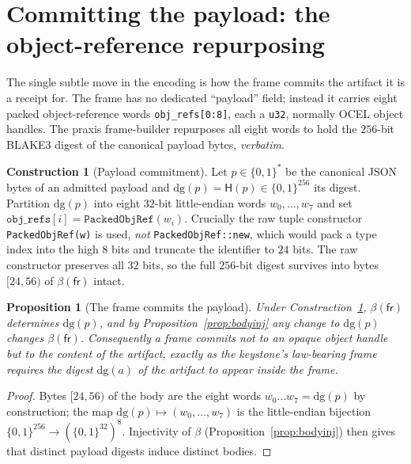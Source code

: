 \documentclass[11pt,oneside]{book}
\theoremstyle{definition}
\newtheorem{construction}{Construction}[chapter]
\theoremstyle{plain}
\newtheorem{proposition}[theorem]{Proposition}
\theoremstyle{remark}
\newcommand{\chainH}{\mathsf{H}}               %
\newcommand{\dg}{\mathrm{dg}}                   %
\newcommand{\fr}{\mathsf{fr}}                   %
\newcommand{\body}{\beta}                       %
\newcommand{\code}[1]{\texttt{#1}}
\begin{document}
\section{Committing the payload: the object-reference repurposing}
\label{sec:commit}

The single subtle move in the encoding is how the frame commits the artifact it is a receipt
for. %
The frame has no dedicated ``payload'' field; instead it carries eight packed
object-reference words \code{obj\_refs[0:8]}, each a \code{u32}, normally OCEL object handles. %
The praxis frame-builder repurposes all eight words to hold the $256$-bit BLAKE3 digest of the
canonical payload bytes, \emph{verbatim}. %

\begin{construction}[Payload commitment]\label{con:commit}
Let $p\in\{0,1\}^{*}$ be the canonical JSON bytes of an admitted payload and $\dg(p)=
\chainH(p)\in\{0,1\}^{256}$ its digest. Partition $\dg(p)$ into eight $32$-bit little-endian
words $w_0,\dots,w_7$ and set $\code{obj\_refs}[i]=\code{PackedObjRef}(w_i)$. %
Crucially the
raw tuple constructor \code{PackedObjRef(w)} is used, \emph{not} \code{PackedObjRef::new},
which would pack a type index into the high $8$ bits and truncate the identifier to $24$
bits. %
The raw constructor preserves all $32$ bits, so the full $256$-bit digest survives
into bytes $[24,56)$ of $\body(\fr)$ intact. %
\end{construction}

\begin{proposition}[The frame commits the payload]\label{prop:payloadcommit}
Under Construction~\ref{con:commit}, $\body(\fr)$ determines $\dg(p)$, and by
Proposition~\ref{prop:bodyinj} any change to $\dg(p)$ changes $\body(\fr)$. %
Consequently a
frame commits not to an opaque object handle but to the content of the artifact, exactly as
the keystone's law-bearing frame requires the digest $\dg(a)$ of the artifact to appear
inside the frame. %
\end{proposition}

\begin{proof}
Bytes $[24,56)$ of the body are the eight words $w_0\dots w_7=\dg(p)$ by construction; the
map $\dg(p)\mapsto(w_0,\dots,w_7)$ is the little-endian bijection $\{0,1\}^{256}\to
(\{0,1\}^{32})^{8}$. Injectivity of $\body$ (Proposition~\ref{prop:bodyinj}) then gives that
distinct payload digests induce distinct bodies. %
 \end{proof}
\end{document}
